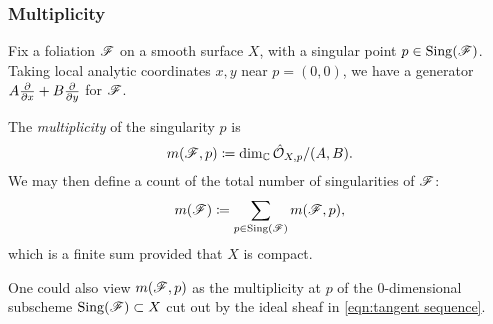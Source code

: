 \subsubsection{Multiplicity}

Fix a foliation $\mathscr{F}$ on a smooth surface $X$, with a singular point
$p\in\operatorname{Sing}(\mathscr{F})$. Taking local analytic coordinates $x,y$ near $p=(0,0)$, we
have a generator $A\pdv{}{x}+B\pdv{}{y}$ for $\mathscr{F}$.

\begin{definition}
    The \emph{multiplicity} of the singularity $p$ is
    \begin{equation*}
        m(\mathscr{F},p)\coloneqq\dim_{\mathbb{C}}\hat{\mathcal{O}}_{X,p}/(A,B).
    \end{equation*}
    We may then define a count of the total number of singularities of $\mathscr{F}$:
    \begin{equation*}
        m(\mathscr{F}) \coloneqq \sum_{p\in\operatorname{Sing}(\mathscr{F})}m(\mathscr{F},p),
    \end{equation*}
    which is a finite sum provided that $X$ is compact.
\end{definition}

\begin{remark}
    One could also view $m(\mathscr{F},p)$ as the multiplicity at $p$ of the
    0-dimensional subscheme $\operatorname{Sing}(\mathscr{F})\subset X$ cut out by the ideal sheaf
    in \cref{eqn:tangent sequence}.
\end{remark}

